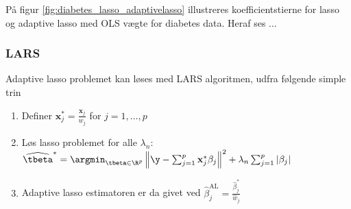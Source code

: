 \begin{eks}
På figur \ref{fig:diabetes_lasso_adaptivelasso} illustreres koefficientstierne for lasso og adaptive lasso med OLS vægte for diabetes data.
Heraf ses ...
\end{eks}

\subsubsection{LARS}
Adaptive lasso problemet kan løses med LARS algoritmen, udfra følgende simple trin
\begin{enumerate}
\item Definer \(\mathbf{x}_j^{*} = \frac{\mathbf{x}_j}{\widehat{w}_j}\) for \(j=1, \ldots, p\)
\item Løs lasso problemet for alle \(\lambda_n\): \(\widehat{\tbeta}^{*} = \argmin_{\tbeta \in \R^p} \left\Vert \y - \sum_{j=1}^p \mathbf{x}_j^{*} \beta_j \right\Vert^2 + \lambda_n \sum_{j=1}^p \vert \beta_j \vert\)
\item Adaptive lasso estimatoren er da givet ved \(\widehat{\beta}_j^{\text{AL}} = \frac{\widehat{\beta}_j^{*}}{\widehat{w}_j}\)
\end{enumerate}
%
%